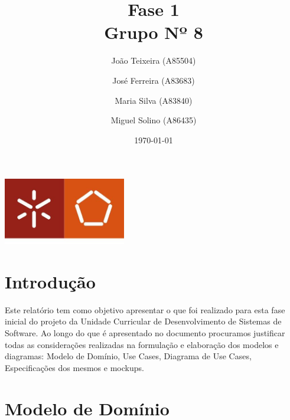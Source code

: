 \documentclass[a4paper]{report}
\begin{document}
\title{Fase 1\\ 
\large Grupo Nº 8}
\author{João Teixeira (A85504) \and José Ferreira (A83683) \and Maria Silva (A83840) \and Miguel Solino (A86435)}
\date{\today}

\begin{center}
    \begin{minipage}{0.75\linewidth}
        \centering
        \includegraphics[width=0.4\textwidth]{images/eng.jpeg}\par\vspace{1cm}
        \vspace{1.5cm}
        \href{https://www.uminho.pt/PT}
        {\color{black}{\scshape\LARGE Universidade do Minho}} \par
        \vspace{1cm}
        \href{https://www.di.uminho.pt/}
        {\color{black}{\scshape\Large Departamento de Informática}} \par
        \vspace{1.5cm}
        \maketitle
    \end{minipage}
\end{center}

\tableofcontents

\pagebreak

\chapter{Introdução}

Este relatório tem como objetivo apresentar o que foi realizado para esta fase
inicial do projeto da Unidade Curricular de Desenvolvimento de Sistemas de
Software. Ao longo do que é apresentado no documento procuramos justificar
todas as considerações realizadas na formulação e elaboração dos modelos e
diagramas: Modelo de Domínio, Use Cases, Diagrama de Use Cases, Especificações
dos mesmos e mockups.

\chapter{Modelo de Domínio}
\end{document}

